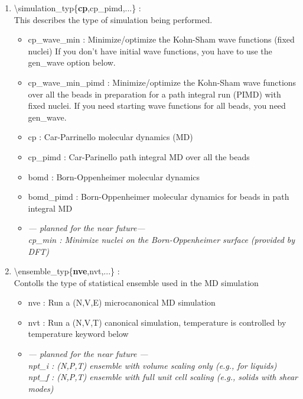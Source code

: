 \documentclass[12pt,titlepage]{article}
\begin{document}
\begin{enumerate}
 \vspace{0.15in}
 \item \textbackslash{}simulation\_typ\{{\bf cp},cp\_pimd,...\} : \\
     This describes the type of simulation being performed.
     \begin{itemize}
      \item cp\_wave\_min : Minimize/optimize the Kohn-Sham wave functions (fixed nuclei)
              If you don't have initial wave functions, you have to
	      use the gen\_wave option below.\\
      \item cp\_wave\_min\_pimd : Minimize/optimize the Kohn-Sham wave functions
		   over all the beads in preparation for a path
		   integral run (PIMD) with fixed nuclei.  If you need
		   starting wave functions for all beads, you need gen\_wave.\\
       \item cp : Car-Parrinello molecular dynamics (MD)\\
       \item cp\_pimd : Car-Parinello path integral MD over all the beads\\
       \item bomd : Born-Oppenheimer molecular dynamics\\
       \item bomd\_pimd : Born-Oppenheimer molecular dynamics for beads in path integral MD\\
       \item 
{\it
--- planned for the near future---\\
cp\_min : Minimize nuclei on the Born-Oppenheimer surface (provided by DFT)
}
 \end{itemize}

 \vspace{0.15in} 
 \item  \textbackslash{}ensemble\_typ\{{\bf nve},nvt,...\} : \\
Contolls the type of statistical ensemble used in the MD simulation
\begin{itemize}
\item nve : Run a (N,V,E) microcanonical MD simulation\\
\item nvt : Run a (N,V,T) canonical simulation, temperature is controlled by 
      temperature keyword below\\
\item {\it
--- planned for the near future ---\\
npt\_i : (N,P,T) ensemble with volume scaling only (e.g., for liquids)\\
npt\_f : (N,P,T) ensemble with full unit cell scaling  (e.g., solids
        with shear modes)
}
\end{itemize}


\end{enumerate}
\end{document}
